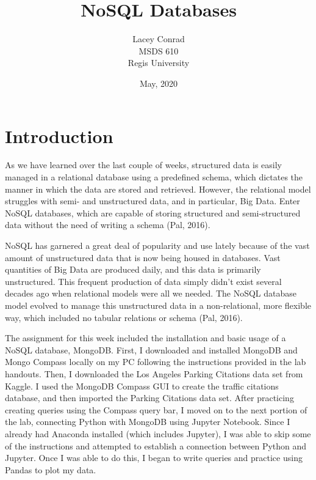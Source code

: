 \documentclass[]{article}
\title{NoSQL Databases}
\author{Lacey Conrad\\MSDS 610\\ Regis University}
\date{May, 2020}
\begin{document}
	\maketitle
	
\section{Introduction}
As we have learned over the last couple of weeks, structured data is easily managed in a relational database using a predefined schema, which dictates the manner in which the data are stored and retrieved.  However, the relational model struggles with semi- and unstructured data, and in particular, Big Data.  Enter NoSQL databases, which are capable of storing structured and semi-structured data without the need of writing a schema (Pal, 2016).

NoSQL has garnered a great deal of popularity and use lately because of the vast amount of unstructured data that is now being housed in databases.  Vast quantities of Big Data are produced daily, and this data is primarily unstructured. This frequent production of data simply didn't exist several decades ago when relational models were all we needed.  The NoSQL database model evolved to manage this unstructured data in a non-relational, more flexible way, which included no tabular relations or schema (Pal, 2016).  

The assignment for this week included the installation and basic usage of a NoSQL database, MongoDB.  First, I downloaded and installed MongoDB and Mongo Compass locally on my PC following the instructions provided in the lab handouts.  Then, I downloaded the Los Angeles Parking Citations data set from Kaggle.  I used the MongoDB Compass GUI to create the traffic citations database, and then imported the Parking Citations data set.  After practicing creating queries using the Compass query bar, I moved on to the next portion of the lab, connecting Python with MongoDB using Jupyter Notebook.  Since I already had Anaconda installed (which includes Jupyter), I was able to skip some of the instructions and attempted to establish a connection between Python and Jupyter.  Once I was able to do this, I began to write queries and practice using Pandas to plot my data.
\end{document}
